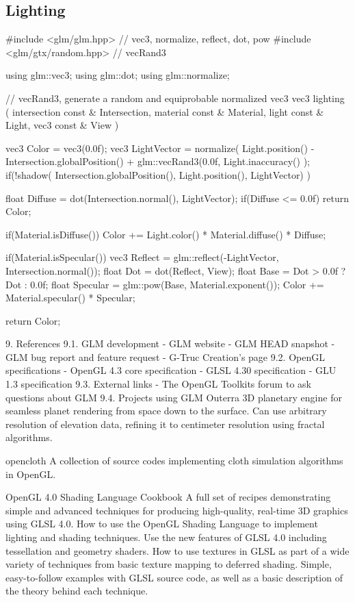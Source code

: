 \documentclass{scrartcl}
\numberwithin{figure}{subsection}
\begin{document}
\subsection{Lighting}

\begin{cppcode}
#include <glm/glm.hpp> // vec3, normalize, reflect, dot, pow
#include <glm/gtx/random.hpp> // vecRand3

using glm::vec3;
using glm::dot;
using glm::normalize;

// vecRand3, generate a random and equiprobable normalized vec3
vec3 lighting
(
  intersection const & Intersection,
  material const & Material,
  light const & Light,
  vec3 const & View
)
{
  vec3 Color = vec3(0.0f);
  vec3 LightVector = normalize(
    Light.position() - Intersection.globalPosition() +
    glm::vecRand3(0.0f, Light.inaccuracy()
  );
  if(!shadow(
    Intersection.globalPosition(), Light.position(), LightVector)
  )
  {
    float Diffuse = dot(Intersection.normal(), LightVector);
    if(Diffuse <= 0.0f)
      return Color;

    if(Material.isDiffuse())
      Color += Light.color() * Material.diffuse() * Diffuse;

    if(Material.isSpecular())
    {
      vec3 Reflect = glm::reflect(-LightVector, Intersection.normal());
      float Dot = dot(Reflect, View);
      float Base = Dot > 0.0f ? Dot : 0.0f;
      float Specular = glm::pow(Base, Material.exponent());
      Color += Material.specular() * Specular;
    }
  }
  return Color;
}
\end{cppcode}

\newpage{}

9. References
9.1. GLM development
- GLM website
- GLM HEAD snapshot
- GLM bug report and feature request
- G-Truc Creation's page
9.2. OpenGL specifications
- OpenGL 4.3 core specification
- GLSL 4.30 specification
- GLU 1.3 specification
9.3. External links
- The OpenGL Toolkits forum to ask questions about GLM
9.4. Projects using GLM 
Outerra
3D planetary engine for seamless planet rendering from space down to the surface. Can use arbitrary resolution of elevation data, refining it to centimeter resolution using fractal algorithms.

opencloth
A collection of source codes implementing cloth simulation algorithms in OpenGL.

OpenGL 4.0 Shading Language Cookbook
A full set of recipes demonstrating simple and advanced techniques for producing high-quality, real-time 3D graphics using GLSL 4.0.
How to use the OpenGL Shading Language to implement lighting and shading techniques.
Use the new features of GLSL 4.0 including tessellation and geometry shaders.
How to use textures in GLSL as part of a wide variety of techniques from basic texture mapping to deferred shading.
Simple, easy-to-follow examples with GLSL source code, as well as a basic description of the theory behind each technique.
\end{document}
